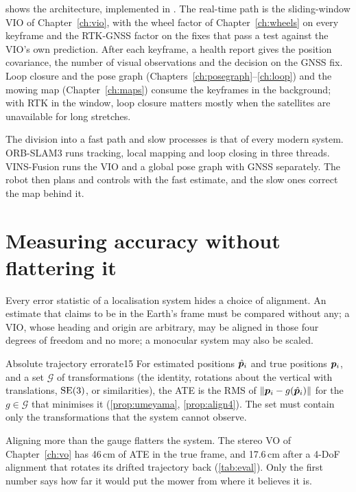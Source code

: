  shows the architecture, implemented in
. The real-time path is the
sliding-window VIO of Chapter~\ref{ch:vio}, with the wheel factor of
Chapter~\ref{ch:wheels} on every keyframe and the RTK-GNSS factor on
the fixes that pass a test against the VIO's own prediction. After each
keyframe, a health report gives the position covariance, the number of
visual observations and the decision on the GNSS fix. Loop closure and
the pose graph (Chapters~\ref{ch:posegraph}--\ref{ch:loop}) and the
mowing map (Chapter~\ref{ch:maps}) consume the keyframes in the
background; with RTK in the window, loop closure matters mostly when
the satellites are unavailable for long stretches.

The division into a fast path and slow processes is that of every
modern system. ORB-SLAM3 runs tracking, local mapping and loop closing
in three threads. VINS-Fusion runs the VIO and a global pose graph with
GNSS separately. The robot then plans and controls with the fast
estimate, and the slow ones correct the map behind it.

\section{Measuring accuracy without flattering it}

Every error statistic of a localisation system hides a choice of
alignment. An estimate that claims to be in the Earth's frame must be
compared without any; a VIO, whose heading and origin are arbitrary,
may be aligned in those four degrees of freedom and no more; a monocular
system may also be scaled.

\begin{definition}{Absolute trajectory error}{ate15}
For estimated positions $\hat{\bm{p}}_i$ and true positions $\bm{p}_i$, and a set
$\mathcal{G}$ of transformations (the identity, rotations about the
vertical with translations, $\mathrm{SE}(3)$, or similarities), the ATE is the RMS
of $\left\lVert \bm{p}_i-g(\hat{\bm{p}}_i)\right\rVert$ for the $g\in\mathcal{G}$ that minimises it
(\cref{prop:umeyama}, \cref{prop:align4}). The set must contain only the
transformations that the system cannot observe.
\end{definition}

Aligning more than the gauge flatters the system. The stereo VO of
Chapter~\ref{ch:vo} has 46\,cm of ATE in the true frame, and 17.6\,cm
after a 4-DoF alignment that rotates its drifted trajectory back
(\cref{tab:eval}). Only the first number says how far it would put the
mower from where it believes it is.

